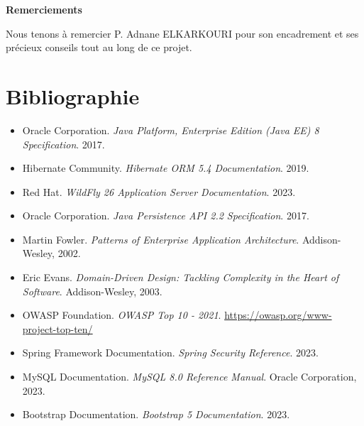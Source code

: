 \documentclass[12pt,a4paper,twoside]{report}
\begin{document}
\vspace{1cm}
\noindent\textbf{Remerciements}

Nous tenons à remercier P. Adnane ELKARKOURI pour son encadrement et ses précieux conseils tout au long de ce projet.

\chapter*{Bibliographie}

\begin{itemize}
    \item Oracle Corporation. \textit{Java Platform, Enterprise Edition (Java EE) 8 Specification}. 2017.
    \item Hibernate Community. \textit{Hibernate ORM 5.4 Documentation}. 2019.
    \item Red Hat. \textit{WildFly 26 Application Server Documentation}. 2023.
    \item Oracle Corporation. \textit{Java Persistence API 2.2 Specification}. 2017.
    \item Martin Fowler. \textit{Patterns of Enterprise Application Architecture}. Addison-Wesley, 2002.
    \item Eric Evans. \textit{Domain-Driven Design: Tackling Complexity in the Heart of Software}. Addison-Wesley, 2003.
    \item OWASP Foundation. \textit{OWASP Top 10 - 2021}. \url{https://owasp.org/www-project-top-ten/}
    \item Spring Framework Documentation. \textit{Spring Security Reference}. 2023.
    \item MySQL Documentation. \textit{MySQL 8.0 Reference Manual}. Oracle Corporation, 2023.
    \item Bootstrap Documentation. \textit{Bootstrap 5 Documentation}. 2023.
\end{itemize}
\end{document}
